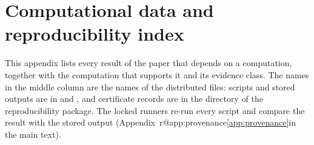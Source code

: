 \providecommand\gref[1]{\ifcsname r@#1\endcsname\ref{#1}\else in the main text\fi}
\section{Computational data and reproducibility index}\label{app:codes}
This appendix lists every result of the paper that depends on a computation,
together with the computation that supports it and its evidence class. The
names in the middle column are the names of the distributed files: scripts
and stored outputs are in  and
, and certificate records
are in the  directory of the reproducibility package.
The locked runners re-run every script and compare the result with the stored
output (Appendix~\gref{app:provenance}).

